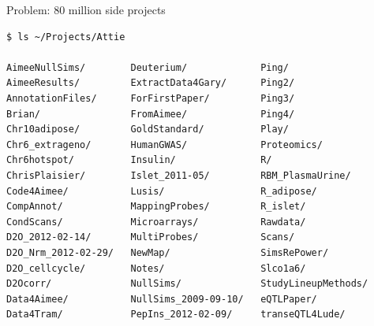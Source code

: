 \documentclass[12pt,t]{beamer}
\begin{document}
\begin{frame}[fragile]{Problem: 80 million side projects}

\vspace{24pt}

\begin{lstlisting}
$ ls ~/Projects/Attie

AimeeNullSims/        Deuterium/             Ping/
AimeeResults/         ExtractData4Gary/      Ping2/
AnnotationFiles/      ForFirstPaper/         Ping3/
Brian/                FromAimee/             Ping4/
Chr10adipose/         GoldStandard/          Play/
Chr6_extrageno/       HumanGWAS/             Proteomics/
Chr6hotspot/          Insulin/               R/
ChrisPlaisier/        Islet_2011-05/         RBM_PlasmaUrine/
Code4Aimee/           Lusis/                 R_adipose/
CompAnnot/            MappingProbes/         R_islet/
CondScans/            Microarrays/           Rawdata/
D2O_2012-02-14/       MultiProbes/           Scans/
D2O_Nrm_2012-02-29/   NewMap/                SimsRePower/
D2O_cellcycle/        Notes/                 Slco1a6/
D2Ocorr/              NullSims/              StudyLineupMethods/
Data4Aimee/           NullSims_2009-09-10/   eQTLPaper/
Data4Tram/            PepIns_2012-02-09/     transeQTL4Lude/
\end{lstlisting}
\end{frame}
\end{document}
